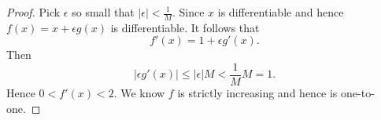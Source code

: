 \begin{Exercise}
\begin{proof}
Pick $\epsilon$ so small that $|\epsilon| < \frac{1}{M}$.
Since $x$ is differentiable and hence $f(x) = x + \epsilon g(x)$ is differentiable.
It follows that
$$
f'(x) = 1 + \epsilon g'(x).
$$
Then
$$
|\epsilon g'(x)| \leq |\epsilon| M < \frac{1}{M} M = 1.
$$
Hence $0 < f'(x) < 2$.
We know $f$ is strictly increasing and hence is one-to-one.
\end{proof}
\end{Exercise}